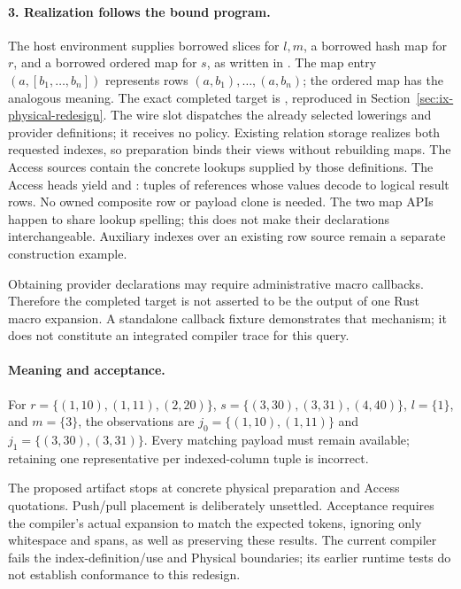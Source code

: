 \paragraph{3. Realization follows the bound program.}
The host environment supplies borrowed slices for $l,m$, a borrowed hash map
for $r$, and a borrowed ordered map for $s$, as written in
.
The map entry $(a,[b_1,\ldots,b_n])$ represents rows
$(a,b_1),\ldots,(a,b_n)$; the ordered map has the analogous meaning.
The exact completed target is , reproduced in
Section~\ref{sec:ix-physical-redesign}. The wire slot
 dispatches the already selected lowerings and provider
definitions; it receives no policy. Existing relation storage realizes both
requested indexes, so preparation binds their views without rebuilding maps.
The Access sources contain the concrete lookups supplied by those definitions.
The Access heads yield  and : tuples of references
whose values decode to logical result rows. No owned composite row or payload
clone is needed. The two map APIs happen to share lookup spelling; this does
not make their declarations interchangeable. Auxiliary indexes over an existing
row source remain a separate construction example.

Obtaining provider declarations may require administrative macro callbacks.
Therefore the completed target is not asserted to be the output of one Rust
macro expansion. A standalone callback fixture demonstrates that mechanism;
it does not constitute an integrated compiler trace for this query.

\paragraph{Meaning and acceptance.}
For $r=\{(1,10),(1,11),(2,20)\}$, $s=\{(3,30),(3,31),(4,40)\}$,
$l=\{1\}$, and $m=\{3\}$, the observations are
$j_0=\{(1,10),(1,11)\}$ and $j_1=\{(3,30),(3,31)\}$.
Every matching payload must remain available; retaining one representative
per indexed-column tuple is incorrect.

The proposed artifact stops at concrete physical preparation and Access
quotations. Push/pull placement is deliberately unsettled. Acceptance
requires the compiler's actual expansion to match the expected tokens,
ignoring only whitespace and spans, as well as preserving these results.
The current compiler fails the index-definition/use and Physical boundaries;
its earlier runtime tests do not establish conformance to this redesign.
